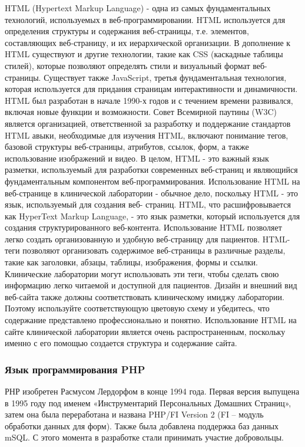 HTML (Hypertext Markup Language) - одна из самых фундаментальных технологий, используемых в веб-программировании. HTML используется для определения структуры и содержания веб-страницы, т.е. элементов,
составляющих веб-страницу, и их иерархической организации.
В дополнение к HTML существуют и другие технологии, такие как CSS
(каскадные таблицы стилей), которые позволяют определять стили и визуальный формат веб-страницы. Существует также JavaScript, третья фундаментальная технология, которая используется для придания страницам интерактивности и динамичности.
HTML был разработан в начале 1990-х годов и с течением времени развивался, включая новые функции и возможности. Совет Всемирной паутины
(W3C) является организацией, ответственной за разработку и поддержание
стандартов HTML
авыки, необходимые для изучения HTML, включают понимание тегов, базовой структуры веб-страницы, атрибутов, ссылок, форм, а также использование изображений и видео.
В целом, HTML - это важный язык разметки, используемый для разработки современных веб-страниц и являющийся фундаментальным компонентом веб-программирования.
Использование HTML на веб-странице в клинической лаборатории - обычное дело, поскольку HTML - это язык, используемый для создания веб- страниц. HTML, что расшифровывается как HyperText Markup Language, - это
язык разметки, который используется для создания структурированного веб-контента. Использование HTML позволяет легко создать организованную и
удобную веб-страницу для пациентов.
HTML-теги позволяют организовать содержимое веб-страницы в различные разделы, такие как заголовки, абзацы, таблицы, изображения, формы
и ссылки. Клинические лаборатории могут использовать эти теги, чтобы сделать свою информацию легко читаемой и доступной для пациентов.
Дизайн и внешний вид веб-сайта также должны соответствовать клиническому имиджу лаборатории. Поэтому используйте соответствующую цветовую схему и убедитесь, что содержание представлено профессионально и
понятно.
Использование HTML на сайте клинической лаборатории является
очень распространенным, поскольку именно с его помощью создается структура и содержание сайта.


\subsubsection{Язык программирования PHP}

РНР изобретен Расмусом Лердорфом в конце 1994 года. Первая версия выпущена в 1995 году под именем «Инструментарий Персональных Домашних Страниц», затем она была переработана и названа PHP/FI Version 2 (FI -- модуль обработки данных для форм). Также была добавлена поддержка баз данных mSQL. С этого момента в разработке стали принимать участие добровольцы.

